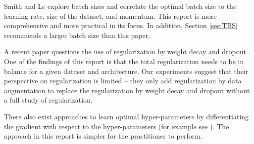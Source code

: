 \documentclass{article} %
\begin{document}
Smith and Le \citep{smith2017understanding} explore batch sizes and correlate the optimal batch size to the learning rate, size of the dataset, and momentum.  This report is  more comprehensive and more practical in its focus.  In addition,  Section \ref{sec:TBS} recommends a larger batch size than this paper.  

A recent paper questions the use of regularization by weight decay and dropout \citep{hernandez2018deep}.  One of the findings of this report is that the total regularization needs to be in balance for a given dataset and architecture.  Our experiments suggest that their perspective on regularization is limited -- they only add regularization by data augmentation to replace the regularization by weight decay and dropout without a full study of regularization.

There also exist approaches to learn optimal hyper-parameters by differentiating the gradient with respect to the hyper-parameters (for example see \cite{lorraine2018stochastic}).  The approach in this report is simpler for the practitioner to perform.

\end{document}
